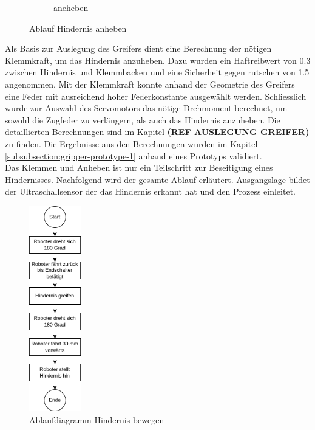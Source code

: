 \begin{figure}[H]
\begin{subfigure}{0.55\textwidth}
\caption{aneheben}
\label{fig:gripper_lifting_side}
\end{subfigure}
\caption{Ablauf Hindernis anheben}
\label{fig:obstacle_gripping_process}
\end{figure}

 \newpage
 
Als Basis zur Auslegung des Greifers dient eine Berechnung der nötigen Klemmkraft, um das Hindernis anzuheben. Dazu wurden ein Haftreibwert von 0.3 zwischen Hindernis und Klemmbacken und eine Sicherheit gegen rutschen von 1.5 angenommen. Mit der Klemmkraft konnte anhand der Geometrie des Greifers eine Feder mit ausreichend hoher Federkonstante ausgewählt werden. Schliesslich wurde zur Auswahl des Servomotors das nötige Drehmoment berechnet, um sowohl die Zugfeder zu verlängern, als auch das Hindernis anzuheben. Die detaillierten Berechnungen sind im Kapitel \textbf{(REF AUSLEGUNG GREIFER)} zu finden. Die Ergebnisse aus den Berechnungen wurden im Kapitel \ref{subsubsection:gripper-prototype-1} anhand eines Prototyps validiert.\\

Das Klemmen und Anheben ist nur ein Teilschritt  zur Beseitigung eines Hindernisses. Nachfolgend wird der gesamte Ablauf erläutert. Ausgangslage bildet der Ultraschallsensor der das Hindernis erkannt hat und den Prozess einleitet. 

\begin{figure}[H]
\centering
\includegraphics[width=0.2\textwidth]{assets/gesamtkonzept/ablaufdiagramm-hindernis-bewegen.png}
\caption{Ablaufdiagramm Hindernis bewegen}
\label{fig:ablaufdiagramm-hindernis-bewegen}
\end{figure}

